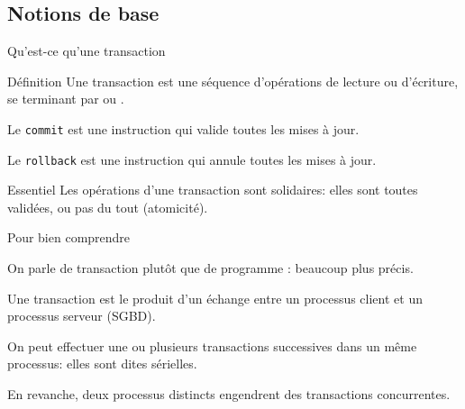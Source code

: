 \subsection{Notions de base}


\begin{frame}{Qu'est-ce qu'une transaction}

\begin{defblock}{Définition}
Une transaction est une séquence d'opérations de \alert{lecture} ou d'\alert{écriture}, 
se terminant par  ou .
\end{defblock}

\vfill

Le \texttt{commit} est une instruction qui \alert{valide} toutes les mises à jour.

\vfill

Le \texttt{rollback} est une instruction qui \alert{annule} toutes les mises à jour.

\vfill

\begin{blocgauche}
\begin{defblock}{\alert{Essentiel}}
Les opérations d'une transaction sont solidaires: elles sont toutes validées, ou pas du tout
(\alert{atomicité}).
\end{defblock}
\end{blocgauche}
\end{frame}

\begin{frame}{Pour bien comprendre}

On parle de \alert{transaction} plutôt que de \alert{programme} : beaucoup plus précis.

\vfill

Une transaction est le produit d'un échange entre un \alert{processus client} et  un \alert{processus 
serveur} (SGBD).  

\vfill

On peut effectuer une ou plusieurs transactions successives dans un même processus: 
elles sont dites \alert{sérielles}.

\vfill

\begin{blocgauche}
En revanche, deux processus \alert{distincts} engendrent des \alert{transactions concurrentes}.
\end{blocgauche}
\end{frame}



